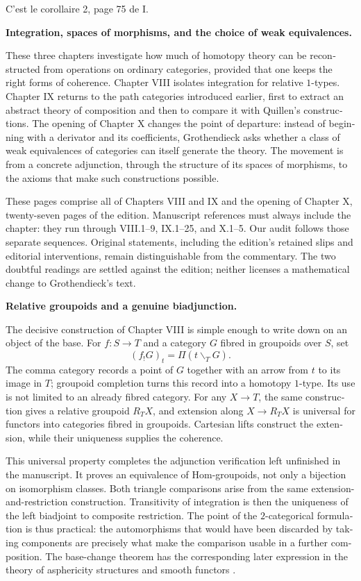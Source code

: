 C’est le corollaire 2, page 75 de I.
\begin{otherlanguage}{english}
\noindent\textbf{Integration, spaces of morphisms, and the choice of weak equivalences.}

These three chapters investigate how much of homotopy theory can be reconstructed from operations on ordinary categories, provided that one keeps the right forms of coherence. Chapter VIII isolates integration for relative $1$-types. Chapter IX returns to the path categories introduced earlier, first to extract an abstract theory of composition and then to compare it with Quillen's constructions. The opening of Chapter X changes the point of departure: instead of beginning with a derivator and its coefficients, Grothendieck asks whether a class of weak equivalences of categories can itself generate the theory. The movement is from a concrete adjunction, through the structure of its spaces of morphisms, to the axioms that make such constructions possible.

These pages comprise all of Chapters VIII and IX and the opening of Chapter X, twenty-seven pages of the edition. Manuscript references must always include the chapter: they run through VIII.1--9, IX.1--25, and X.1--5. Our audit follows those separate sequences. Original statements, including the edition's retained slips and editorial interventions, remain distinguishable from the commentary. The two doubtful readings are settled against the edition; neither licenses a mathematical change to Grothendieck's text.

\medskip\noindent\textbf{Relative groupoids and a genuine biadjunction.}

The decisive construction of Chapter VIII is simple enough to write down on an object of the base. For $f:S\to T$ and a category $G$ fibred in groupoids over $S$, set
\[
 (f_!G)_t=\Pi(t\backslash_TG).
\]
The comma category records a point of $G$ together with an arrow from $t$ to its image in $T$; groupoid completion turns this record into a homotopy $1$-type. Its use is not limited to an already fibred category. For any $X\to T$, the same construction gives a relative groupoid $R_TX$, and extension along $X\to R_TX$ is universal for functors into categories fibred in groupoids. Cartesian lifts construct the extension, while their uniqueness supplies the coherence.

This universal property completes the adjunction verification left unfinished in the manuscript. It proves an equivalence of Hom-groupoids, not only a bijection on isomorphism classes. Both triangle comparisons arise from the same extension-and-restriction construction. Transitivity of integration is then the uniqueness of the left biadjoint to composite restriction. The point of the $2$-categorical formulation is thus practical: the automorphisms that would have been discarded by taking components are precisely what make the comparison usable in a further composition. The base-change theorem has the corresponding later expression in the theory of asphericity structures and smooth functors \citep[\S5]{Maltsiniotis2005Asphericite}.


\end{otherlanguage}
